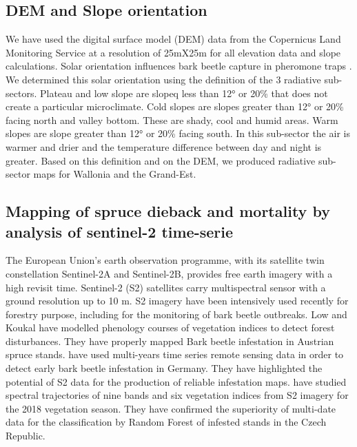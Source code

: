 \documentclass[3p,procedia]{elsarticle}
\begin{document}



\subsection{DEM and Slope orientation}


We have used the digital surface model (DEM) data from the Copernicus Land Monitoring Service \citep{DEM_copernicus}  at a resolution of 25mX25m for all elevation data and slope calculations.
Solar orientation influences bark beetle capture in pheromone traps \citep{AFR64}. We determined this solar orientation using the \cite{Delvaux_galoux} definition of the 3 radiative sub-sectors.
Plateau and low slope are slopeq less than 12° or 20\% that does not create a particular microclimate. Cold slopes are slopes greater than 12° or 20\% facing north and valley bottom. These are shady, cool and humid areas. Warm slopes are slope greater than 12° or 20\% facing south. In this sub-sector the air is warmer and drier and the temperature difference between day and night is greater. Based on this definition and on the DEM, we produced radiative sub-sector maps for Wallonia and the Grand-Est.

\subsection{Mapping of spruce dieback and mortality by analysis of sentinel-2 time-serie}


The European Union’s earth observation programme, with its satellite twin constellation Sentinel-2A and Sentinel-2B, provides free earth imagery with a high revisit time. 
Sentinel-2 (S2) satellites carry multispectral sensor with a ground resolution up to 10 m. 
S2 imagery have been intensively used recently for forestry purpose, including for the monitoring of bark beetle outbreaks. 
Low and Koukal \citep{low_phenology_2020} have modelled phenology courses of vegetation indices to detect forest disturbances. 
They have properly mapped Bark beetle infestation in Austrian spruce stands.
\cite{ali_canopy_2021} have used multi-years time series remote sensing data in order to detect early bark beetle infestation in Germany. 
They have highlighted the potential of S2 data for the production of reliable infestation maps.
\cite{barta_early_2021} have studied spectral trajectories of nine bands and six vegetation indices from S2 imagery for the 2018 vegetation season. 
They have confirmed the superiority of multi-date data for the classification by Random Forest of infested stands in the Czech Republic.
\end{document}

